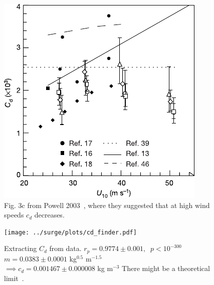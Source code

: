 

    \begin{figure}
            \includegraphics[width=1\linewidth]{images/example-images/cd.pdf}
                \caption{Fig. 3c from Powell 2003~\cite{powell2003reduced},
                 where they suggested that at high wind speeds $c_d$ decreases.}
    \end{figure}
\begin{figure}[htb!]
    \centering
    \texttt{[image: ../surge/plots/cd\_finder.pdf]}
    \caption{ Extracting $C_d$ from data.
    $ r_p = 0.9774 \pm 0.001,\;\; p<10^{-300}$\\
    $ m = 0.0383 \pm 0.0001 $ kg$^{0.5}$ m$^{-1.5}$\\
    $\implies  c_d = 0.001467 \pm 0.000008$ kg m$^{-3}$
    There might be a theoretical limit~\cite{donelan2004limiting}.
    }
\end{figure}
